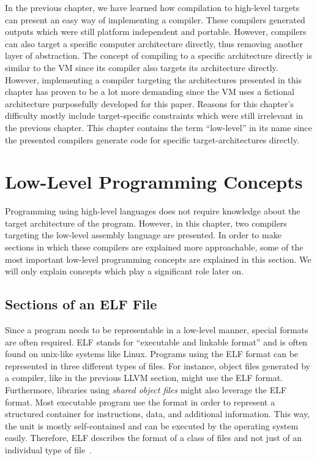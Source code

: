 In the previous chapter, we have learned how compilation to high-level targets can present an easy way of implementing a compiler.
These compilers generated outputs which were still platform independent and portable.
However, compilers can also target a specific computer architecture directly, thus removing another layer of abstraction.
The concept of compiling to a specific architecture directly is similar to the VM since its compiler also targets its architecture directly.
However, implementing a compiler targeting the architectures presented in this chapter has proven to be a lot more demanding since the VM uses a fictional architecture purposefully developed for this paper.
Reasons for this chapter's difficulty mostly include target-specific constraints which were
still irrelevant in the previous chapter.
This chapter contains the term \enquote{low-level} in its name since the presented compilers
generate code for specific target-architectures directly.

\section{Low-Level Programming Concepts}
Programming using high-level languages does not require knowledge about the target architecture of the program.
However, in this chapter, two compilers targeting the low-level assembly language are presented.
In order to make sections in which these compilers are explained more approachable,
some of the most important low-level programming concepts are explained in this section.
We will only explain concepts which play a significant role later on.

\subsection{Sections of an ELF File}
Since a program needs to be representable in a low-level manner, special formats are often required.
ELF stands for \enquote{executable and linkable format} and is often found on unix-like systems like Linux.
Programs using the ELF format can be represented in three different types of files.
For instance, object files generated by a compiler, like in the previous LLVM section, might use the ELF format.
Furthermore, libraries using \emph{shared object files} might also leverage the ELF format.
Most executable program use the format in order to represent a structured container for instructions, data, and additional information.
This way, the unit is mostly self-contained and can be executed by the operating system easily.
Therefore, ELF describes the format of a class of files and not just of an individual type of file~\cite[pp.~74-76]{Zhirkov2017-wk}.

